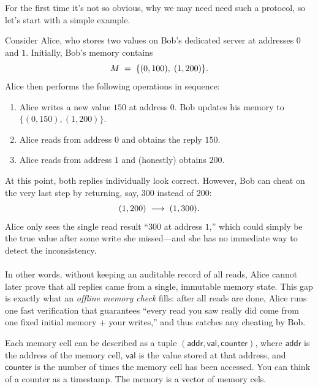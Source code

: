 \documentclass[../lecture-notes-148x210.tex]{subfiles}
\begin{document}
For the first time it's not so obvious, why we may need need such a protocol, so let's start with a simple 
example.
\begin{example}
    Consider Alice, who stores two values on Bob's dedicated server at addresses $0$ and $1$.  Initially, 
    Bob's memory contains
    \vspace{-5px}
    \begin{equation*}
      M \;=\;\{(0,100),\;(1,200)\}.
      \vspace{-5px}
    \end{equation*}
    Alice then performs the following operations in sequence:
    \begin{enumerate}
        \item Alice writes a new value $150$ at address $0$.  Bob updates his memory to $\{(0,150),(1,200)\}$.
        \item Alice reads from address $0$ and obtains the reply $150$.
        \item Alice reads from address $1$ and (honestly) obtains $200$.
    \end{enumerate}
    At this point, both replies individually look correct. However, Bob can cheat on the very last step by 
    returning, say, $300$ instead of $200$:
    \vspace{-5px}
    \begin{equation*}
      (1,200)\;\longrightarrow\;(1,300).
      \vspace{-5px}
    \end{equation*}
    Alice only sees the single read result ``$300$ at address $1$,'' which could simply be the true value 
    after some write she missed—and she has no immediate way to detect the inconsistency.\\ \\
    In other words, without keeping an auditable record of all reads, Alice cannot later prove that all 
    replies came from a single, immutable memory state.  This gap is exactly what an \emph{offline memory check}
    fills: after all reads are done, Alice runs one fast verification that guarantees “every read you saw really
    did come from one fixed initial memory + your writes,” and thus catches any cheating by Bob.
\end{example}

Each memory cell can be described as a tuple $\mathsf{(addr, val, counter)}$, where $\mathsf{addr}$ is the
address of the memory cell, $\mathsf{val}$ is the value stored at that address, and $\mathsf{counter}$ is the
number of times the memory cell has been accessed. You can think of a counter as a timestamp. The memory is
a vector of memory cels.
\end{document}
